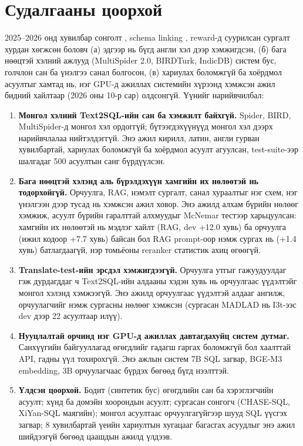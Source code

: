 \section{Судалгааны цоорхой}
\label{sec:gap}

2025--2026 онд хувилбар сонголт \cite{liu_2025_xiyan_sql, bai_2025_judgesql}, schema linking \cite{cao_2024_rsl_sql},
reward-д суурилсан сургалт \cite{zhang_2025_reward_sql} хурдан хөгжсөн боловч (а) эдгээр нь бүгд англи хэл дээр
хэмжигдсэн, (б) бага нөөцтэй хэлний ажлууд (MultiSpider 2.0, BIRDTurk, IndicDB) систем бус, голчлон сан ба үнэлгээ санал
болгосон, (в) хариулах боломжгүй ба хоёрдмол асуултыг хамтад нь, нэг GPU-д ажиллах системийн хүрээнд хэмжсэн ажил бидний
хайлтаар (2026 оны 10-р сар) олдсонгүй. Үүнийг нарийвчилбал:

\begin{enumerate}
  \item \textbf{Монгол хэлний Text2SQL-ийн сан ба хэмжилт байхгүй.} Spider, BIRD, MultiSpider-д монгол хэл ордоггүй;
        бүтээгдэхүүнүүд монгол хэл дээрх нарийвчлалаа нийтэлдэггүй. Энэ ажил кирилл, латин, англи гурван хувилбартай,
        хариулах боломжгүй ба хоёрдмол асуулт агуулсан, test-suite-ээр шалгадаг 500 асуултын санг бүрдүүлсэн.
  \item \textbf{Бага нөөцтэй хэлэнд аль бүрэлдэхүүн хамгийн их нөлөөтэй нь тодорхойгүй.} Орчуулга, RAG, нэмэлт сургалт,
        санал хураалтыг нэг схем, нэг үнэлгээн дээр тусад нь хэмжсэн ажил ховор. Энэ ажилд алхам бүрийн нөлөөг хэмжиж,
        асуулт бүрийн гаралттай алхмуудыг McNemar тестээр харьцуулсан: хамгийн их нөлөөтэй нь мэдлэг хайлт (RAG, dev
        +12.0 хувь) ба орчуулга (ижил кодоор +7.7 хувь) байсан бол RAG prompt-оор нэмж сургах нь (+1.4 хувь) батлагдаагүй,
        нэр томьёоны reranker статистик ахиц өгөөгүй.
  \item \textbf{Translate-test-ийн эрсдэл хэмжигдээгүй.} Орчуулга утгыг гажуудуулдаг гэж дурдагддаг ч Text2SQL-ийн алдааны
        хэдэн хувь нь орчуулгаас үүдэлтэйг монгол хэлэнд хэмжээгүй. Энэ ажилд орчуулгаас үүдэлтэй алдааг ангилж, орчуулагчийг
        нэмж сургасны нөлөөг хэмжсэн (сургасан MADLAD нь I3t-ээс dev дээр 22 асуултаар илүү).
  \item \textbf{Нууцлалтай орчинд нэг GPU-д ажиллах давтагдахуйц систем дутмаг.} Санхүүгийн байгууллагад өгөгдлийг гадагш
        гаргах боломжгүй бол хаалттай API, гадны үүл тохирохгүй. Энэ ажлын систем 7B SQL загвар, BGE-M3 embedding, 3B
        орчуулагчаас бүрдэх бөгөөд бүгд нээлттэй.
  \item \textbf{Үлдсэн цоорхой.} Бодит (синтетик бус) өгөгдлийн сан ба хэрэглэгчийн асуулт; хүнд ба домэйн хоорондын
        асуулт; сургасан сонгогч (CHASE-SQL, XiYan-SQL маягийн); монгол асуултаас орчуулгагүйгээр шууд SQL үүсгэх загвар;
        8 хувилбартай үеийн хариултын хугацааг багасгах асуудлыг энэ ажил шийдээгүй бөгөөд цаашдын ажилд үлдээв.
\end{enumerate}

